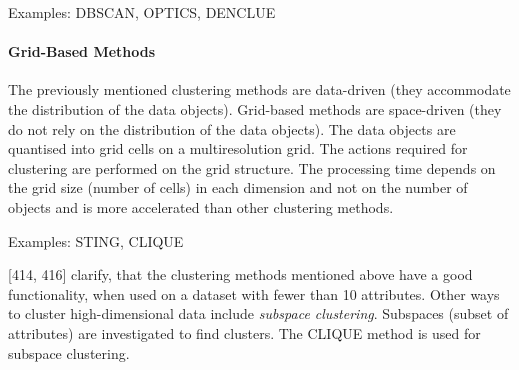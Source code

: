   Examples: DBSCAN, OPTICS, DENCLUE



  \paragraph{Grid-Based Methods}
  The previously mentioned clustering methods are data-driven (they accommodate the distribution of the data objects). Grid-based methods are space-driven (they do not rely on the distribution of the data objects). The data objects are quantised into grid cells on a multiresolution grid. The actions required for clustering are performed on the grid structure. The processing time depends on the grid size (number of cells) in each dimension and not on the number of objects and is more accelerated than other clustering methods.
  
  Examples: STING, CLIQUE


\textcite{han2011data}[414, 416] clarify, that the clustering methods mentioned above have a good functionality, when used on a dataset with fewer than 10 attributes. Other ways to cluster high-dimensional data include \textit{subspace clustering}. Subspaces (subset of attributes) are investigated to find clusters. The CLIQUE method is used for subspace clustering.


